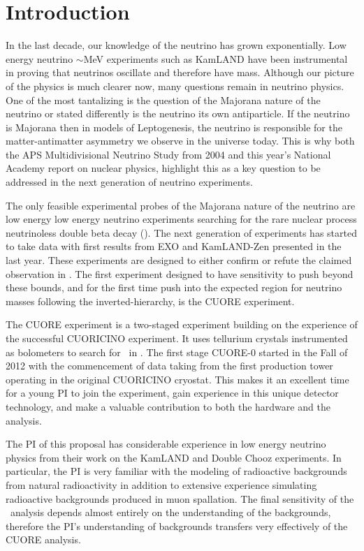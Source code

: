 

\section{Introduction}
In the last decade, our knowledge of the neutrino has grown exponentially. Low energy neutrino $\sim$MeV experiments such as KamLAND have been instrumental in proving that neutrinos oscillate and therefore have mass. Although our picture of the physics is much clearer now, many questions remain in neutrino physics. One of the most tantalizing is the question of the Majorana nature of the neutrino or stated differently is the neutrino its own antiparticle. If the neutrino is Majorana then in models of Leptogenesis, the neutrino is responsible for the matter-antimatter  asymmetry we observe in the universe today. This is why both the APS Multidivisional Neutrino Study from 2004 \cite{numatrix}  and this year's National Academy report on nuclear physics\cite{national2012Nuclear}, highlight this as a key question to be addressed in the next generation of neutrino experiments.

The only feasible experimental probes of the Majorana nature of the neutrino are low energy low energy neutrino experiments searching for the rare nuclear process neutrinoless double beta decay (\zeronu). The next generation of experiments has started to take data with first results from EXO\cite{EXO2012} and KamLAND-Zen\cite{KZ2nu} presented in the last year. These experiments are designed to either confirm or refute the claimed observation in \isoge\cite{KKK2006}. The first experiment designed to have sensitivity to push beyond these bounds, and for the first time push into the expected region for neutrino masses following the inverted-hierarchy, is the CUORE experiment. 

The CUORE experiment is a two-staged experiment building on the experience of the successful CUORICINO experiment\cite{CC2008}. It uses tellurium crystals instrumented as bolometers to search for \zeronu~in \isomain. The first stage CUORE-0 started in the Fall of 2012 with the commencement of data taking from the first production tower operating in the original CUORICINO cryostat. This makes it an excellent time for a young PI to join the experiment, gain experience in this unique detector technology, and make a valuable contribution to both the hardware and the analysis.

The PI of this proposal has considerable experience in low energy neutrino physics from their work on the KamLAND and Double Chooz experiments. In particular, the PI is very familiar with the modeling of radioactive backgrounds from natural radioactivity in addition to extensive experience simulating radioactive backgrounds produced in muon spallation. The final sensitivity of the \zeronu~analysis depends almost entirely on the understanding of the backgrounds, therefore the PI's understanding of backgrounds transfers very effectively of the CUORE analysis.

